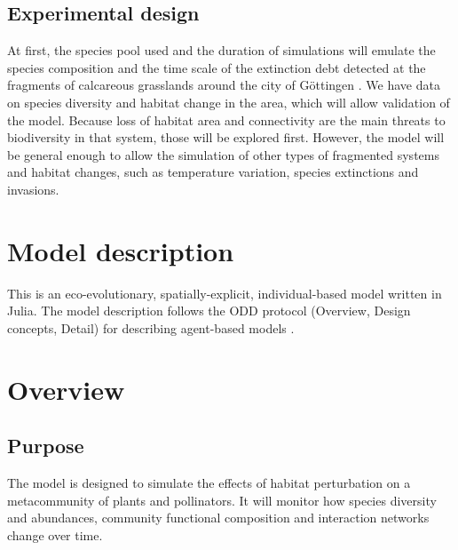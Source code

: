\documentclass[11pt, a4paper]{article}
\begin{document}
\subsection{Experimental design}
At first, the species pool used and the duration of simulations will emulate the species composition and the time scale of the extinction debt detected at the fragments of calcareous grasslands around the city of Göttingen \cite{Krauss1, Krauss2}. We have data on species diversity and habitat change in the area, which will allow validation of the model. Because loss of habitat area and connectivity are the main threats to biodiversity in that system, those will be explored first. However, the model will be general enough to allow the simulation of other types of fragmented systems and habitat changes, such as temperature variation, species extinctions and  invasions.
\section{Model description}
This is an eco-evolutionary, spatially-explicit, individual-based model written in Julia. The model description follows the ODD protocol (Overview, Design concepts, Detail) for describing agent-based models \cite{ODD1,ODD2,ABMbook}.

\section{Overview}
\subsection{Purpose}
The model is designed to simulate the effects of habitat perturbation on a metacommunity of plants and pollinators. It will monitor how species diversity and abundances, community functional composition and interaction networks change over time.
\end{document}
